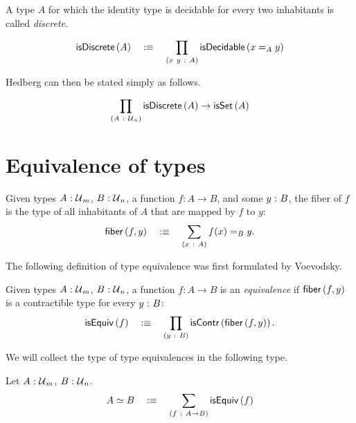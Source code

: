 A type $A$ for which the identity type is decidable for every two inhabitants is called
\emph{discrete}.
\begin{defn}[Discrete]
  \begin{equation*}
    \mathsf{isDiscrete}\left(A\right) \quad:\equiv\quad \prod_{(x~y~:~A)} \mathsf{isDecidable}\left(x =_A y\right)
  \end{equation*}
\end{defn}

Hedberg can then be stated simply as follows.
\begin{thm}[Hedberg]\label{thm:hedberg}
  \begin{equation*}
    \prod_{(A~:~\mathcal{U}{}_n)} \mathsf{isDiscrete}\left(A\right) \rightarrow \mathsf{isSet}\left(A\right)
  \end{equation*}
\end{thm}

\section{Equivalence of types}

\begin{defn}[Fiber]
  Given types $A\hspace{0.1mm}:\hspace{0.1mm}\mathcal{U}{}_m$, $B\hspace{0.1mm}:\hspace{0.1mm}\mathcal{U}{}_n$, a function
  $f : A \rightarrow B$, and some $y\hspace{0.1mm}:\hspace{0.1mm}B$, the fiber of $f$ is the type of all inhabitants
  of $A$ that are mapped by $f$ to $y$:
  \begin{equation*}
    \mathsf{fiber}\left(f, y\right) \quad:\equiv\quad \sum_{(x~:~A)} f(x) =_B y.
  \end{equation*}
\end{defn}

The following definition of type equivalence was first formulated by Voevodsky.

\begin{defn}
  Given types $A\hspace{0.1mm}:\hspace{0.1mm}\mathcal{U}{}_m$, $B\hspace{0.1mm}:\hspace{0.1mm}\mathcal{U}{}_n$, a function $f : A \rightarrow B$ is an
  \emph{equivalence} if $\mathsf{fiber}\left(f, y\right)$ is a contractible type for every $y\hspace{0.1mm}:\hspace{0.1mm}B$:
  \begin{equation*}
    \mathsf{isEquiv}\left(f\right) \quad:\equiv\quad \prod_{(y~:~B)} \mathsf{isContr}\left(\mathsf{fiber}\left(f, y\right)\right).
  \end{equation*}
\end{defn}

We will collect the type of type equivalences in the following type.

\begin{defn}
  Let $A\hspace{0.1mm}:\hspace{0.1mm}\mathcal{U}{}_m$, $B\hspace{0.1mm}:\hspace{0.1mm}\mathcal{U}{}_n$.
  \begin{equation*}
    A \simeq B \quad:\equiv\quad \sum_{(f~:~A \rightarrow B)} \mathsf{isEquiv}\left(f\right)
  \end{equation*}
\end{defn}

